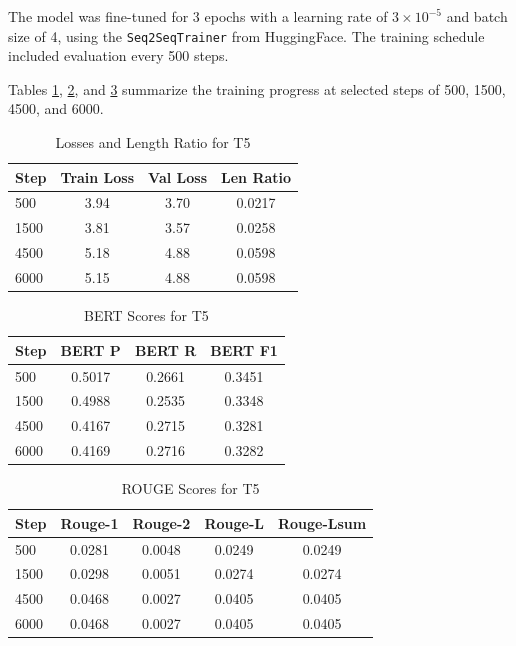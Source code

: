 \documentclass[11pt]{article}
\begin{document}
The model was fine-tuned for 3 epochs with a learning rate of $3 \times 10^{-5}$ and batch size of 4, using the \texttt{Seq2SeqTrainer} from HuggingFace. The training schedule included evaluation every 500 steps.

Tables \ref{tab:losses_t5}, \ref{tab:bertscores_t5}, and \ref{tab:rouge_t5} summarize the training progress at selected steps of 500, 1500, 4500, and 6000.

\begin{table}[h!]
\centering
\caption{Losses and Length Ratio for T5}
\begin{tabular}{@{}lccc@{}}
\toprule
\textbf{Step} & \textbf{Train Loss} & \textbf{Val Loss} & \textbf{Len Ratio} \\
\midrule
500 & 3.94 & 3.70 & 0.0217 \\
1500 & 3.81 & 3.57 & 0.0258 \\
4500 & 5.18 & 4.88 & 0.0598 \\
6000 & 5.15 & 4.88 & 0.0598 \\
\bottomrule
\end{tabular}
\label{tab:losses_t5}
\end{table}

\begin{table}[h!]
\centering
\caption{BERT Scores for T5}
\begin{tabular}{@{}lccc@{}}
\toprule
\textbf{Step} & \textbf{BERT P} & \textbf{BERT R} & \textbf{BERT F1} \\
\midrule
500 & 0.5017 & 0.2661 & 0.3451 \\
1500 & 0.4988 & 0.2535 & 0.3348 \\
4500 & 0.4167 & 0.2715 & 0.3281 \\
6000 & 0.4169 & 0.2716 & 0.3282 \\
\bottomrule
\end{tabular}
\label{tab:bertscores_t5}
\end{table}

\begin{table}[h!]
\centering
\small
\setlength{\tabcolsep}{4pt} %
\caption{ROUGE Scores for T5}
\begin{tabular}{@{}lcccc@{}}
\toprule
\textbf{Step} & \textbf{Rouge-1} & \textbf{Rouge-2} & \textbf{Rouge-L} & \textbf{Rouge-Lsum} \\
\midrule
500 & 0.0281 & 0.0048 & 0.0249 & 0.0249 \\
1500 & 0.0298 & 0.0051 & 0.0274 & 0.0274 \\
4500 & 0.0468 & 0.0027 & 0.0405 & 0.0405 \\
6000 & 0.0468 & 0.0027 & 0.0405 & 0.0405 \\
\bottomrule
\end{tabular}
\label{tab:rouge_t5}
\end{table}
\end{document}
